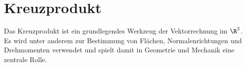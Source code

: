\section{Kreuzprodukt}
\label{sec:vector_algebra_cross_product}

Das Kreuzprodukt ist ein grundlegendes Werkzeug der Vektorrechnung im $\R^3$.
Es wird unter anderem zur Bestimmung von Flächen, Normalenrichtungen und
Drehmomenten verwendet und spielt damit in Geometrie und Mechanik eine
zentrale Rolle.




